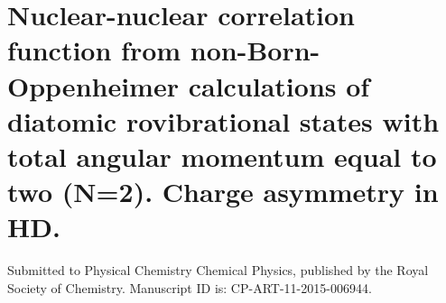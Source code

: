 \chapter{Nuclear-nuclear correlation function from non-Born-Oppenheimer calculations of diatomic rovibrational states with total angular momentum equal to two (N=2). Charge asymmetry in HD.\label{apndx9}}

Submitted to Physical Chemistry Chemical Physics, published by the Royal Society of Chemistry.
Manuscript ID is: CP-ART-11-2015-006944.



